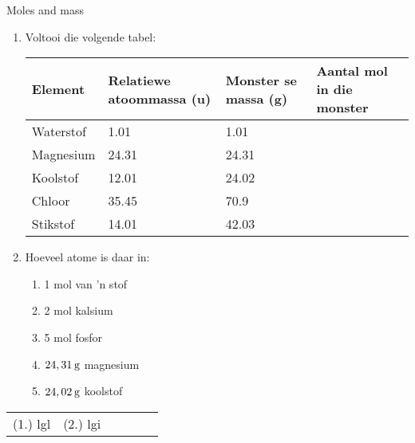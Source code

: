             \begin{exercises}{Moles and mass }
            \nopagebreak
      \label{m38717*id276067}\begin{enumerate}[noitemsep, label=\textbf{\arabic*}. ] 
\item Voltooi die volgende tabel:
          \begin{table}[H]
        \begin{center}
      \label{m38717*id276082}
    \noindent
      \begin{tabular}{|l|l|l|l|}\hline
\textbf{Element} & \textbf{Relatiewe atoommassa (u)} & \textbf{Monster se massa (g)} & \textbf{Aantal mol in die monster} \\ \hline
        Waterstof & 1.01 & 1.01 & \\ \hline
        Magnesium & 24.31 & 24.31 & \\ \hline
        Koolstof & 12.01 & 24.02 & \\ \hline
        Chloor & 35.45 & 70.9 & \\ \hline
        Stikstof & 14.01 & 42.03 & \\ \hline
    \end{tabular}
      \end{center}
\end{table}
    \par
          \label{m38717*uid3}\item 
Hoeveel atome is daar in:
\label{m38717*id276311}\begin{enumerate}[noitemsep, label=\textbf{\alph*}. ] 
            \label{m38717*uid4}\item 1 mol van 'n stof
\label{m38717*uid5}\item 2 mol kalsium
\label{m38717*uid6}\item 5 mol fosfor
\label{m38717*uid7}\item $24,31\phantom{\rule{2pt}{0ex}}\text{g}$ magnesium
\label{m38717*uid8}\item $24,02\phantom{\rule{2pt}{0ex}}\text{g}$ koolstof
\end{enumerate}
                \end{enumerate}
    \label{m38717*cid3}
\practiceinfo
 \par \begin{tabular}[h]{cccccc}
 (1.) lgl  &  (2.) lgi  & \end{tabular}
\end{exercises}
